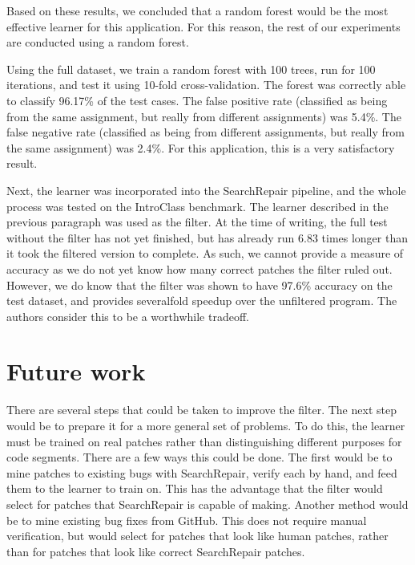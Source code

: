 \documentclass[conference]{IEEEtran}
\begin{document}
Based on these results, we concluded that a random forest would be the most effective learner for this application. 
For this reason, the rest of our experiments are conducted using a random forest.


Using the full dataset, we train a random forest with 100 trees, run for 100 iterations, and test it using 10-fold cross-validation. 
The forest was correctly able to classify 96.17\% of the test cases. The false positive rate (classified as being from the same assignment, but really from different assignments) was 5.4\%. 
The false negative rate (classified as being from different assignments, but really from the same assignment)  was 2.4\%. 
For this application, this is a very satisfactory result. 

Next, the learner was incorporated into the SearchRepair pipeline, and the whole process was tested on the IntroClass benchmark. 
The learner described in the previous paragraph was used as the filter. 
At the time of writing, the full test without the filter has not yet finished, but has already run 6.83 times longer than it took the filtered version to complete. 
As such, we cannot provide a measure of accuracy as we do not yet know how many correct patches the filter ruled out. 
However, we do know that the filter was shown to have 97.6\% accuracy on the test dataset, and provides severalfold speedup over the unfiltered program. 
The authors consider this to be a worthwhile tradeoff.


\section{Future work}


There are several steps that could be taken to improve the filter. 
The next step would be to prepare it for a more general set of problems. 
To do this, the learner must be trained on real patches rather than distinguishing different purposes for code segments.
There are a few ways this could be done. 
The first would be to mine patches to existing bugs with SearchRepair, verify each by hand, and feed them to the learner to train on. 
This has the advantage that the filter would select for patches that SearchRepair is capable of making. 
Another method would be to mine existing bug fixes from GitHub. This does not require manual verification, but would select for patches that look like human patches, rather than for patches that look like correct SearchRepair patches. 
\end{document}
